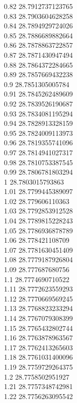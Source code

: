 {0.82	28.7912737123765\\
0.83	28.7903604628258\\
0.84	28.7894929724026\\
0.85	28.7886689882664\\
0.86	28.7878863722857\\
0.87	28.7871430947494\\
0.88	28.7864372284665\\
0.89	28.7857669432238\\
0.9	28.7851305005784\\
0.91	28.7845262489609\\
0.92	28.7839526190687\\
0.93	28.7834081195294\\
0.94	28.7828913328159\\
0.95	28.7824009113973\\
0.96	28.7819355741096\\
0.97	28.7814941027317\\
0.98	28.7810753387545\\
0.99	28.7806781803294\\
1	28.7803015793863\\
1.01	28.7799445389097\\
1.02	28.779606110363\\
1.03	28.7792853912528\\
1.04	28.7789815228243\\
1.05	28.7786936878789\\
1.06	28.778421108709\\
1.07	28.7781630451409\\
1.08	28.7779187926804\\
1.09	28.777687680756\\
1.1	28.7774690710522\\
1.11	28.7772623559293\\
1.12	28.7770669569245\\
1.13	28.7768823233294\\
1.14	28.7767079308399\\
1.15	28.7765432802744\\
1.16	28.7763878963567\\
1.17	28.7762413265603\\
1.18	28.7761031400096\\
1.19	28.7759729264375\\
1.2	28.7758502951927\\
1.21	28.7757348742981\\
1.22	28.7756263095542\\
}
